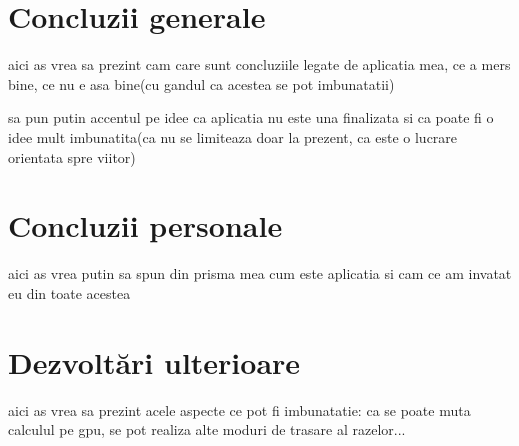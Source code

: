 \section{Concluzii generale}	

	aici as vrea sa prezint cam care sunt concluziile legate de aplicatia mea, ce a mers bine, ce nu e asa bine(cu gandul ca acestea se pot imbunatatii)
	
	sa pun putin accentul pe idee ca aplicatia nu este una finalizata si ca poate fi o idee mult imbunatita(ca nu se limiteaza doar la prezent, ca este o lucrare orientata spre viitor)

\section{Concluzii personale}

	aici as vrea putin sa spun din prisma mea cum este aplicatia si cam ce am invatat eu din toate acestea

\section{Dezvolt\u{a}ri ulterioare}

	aici as vrea sa prezint acele aspecte ce pot fi imbunatatie: ca se poate muta calculul pe gpu, se pot realiza alte moduri de trasare al razelor...